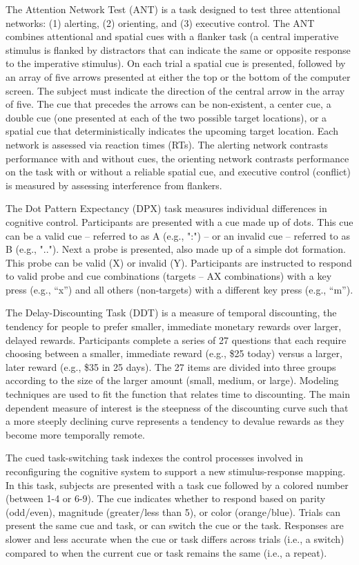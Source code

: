 \documentclass[sn-mathphys,Numbered, super]{sn-jnl}
\begin{document}
The Attention Network Test (ANT) is a task designed to test three attentional networks: (1) alerting, (2) orienting, and (3) executive control. The ANT combines attentional and spatial cues with a flanker task (a central imperative stimulus is flanked by distractors that can indicate the same or opposite response to the imperative stimulus). On each trial a spatial cue is presented, followed by an array of five arrows presented at either the top or the bottom of the computer screen. The subject must indicate the direction of the central arrow in the array of five. The cue that precedes the arrows can be non-existent, a center cue, a double cue (one presented at each of the two possible target locations), or a spatial cue that deterministically indicates the upcoming target location. Each network is assessed via reaction times (RTs). The alerting network contrasts performance with and without cues, the orienting network contrasts performance on the task with or without a reliable spatial cue, and executive control (conflict) is measured by assessing interference from flankers.

The Dot Pattern Expectancy (DPX) task measures individual differences in cognitive control. Participants are presented with a cue made up of dots. This cue can be a valid cue – referred to as A (e.g., ":") – or an invalid cue – referred to as B (e.g., ".."). Next a probe is presented, also made up of a simple dot formation. This probe can be valid (X) or invalid (Y). Participants are instructed to respond to valid probe and cue combinations (targets – AX combinations) with a key press (e.g., “x”) and all others (non-targets) with a different key press (e.g., “m”).

The Delay-Discounting Task (DDT) is a measure of temporal discounting, the tendency for people to prefer smaller, immediate monetary rewards over larger, delayed rewards. Participants complete a series of 27 questions that each require choosing between a smaller, immediate reward (e.g., \$25 today) versus a larger, later reward (e.g., \$35 in 25 days). The 27 items are divided into three groups according to the size of the larger amount (small, medium, or large). Modeling techniques are used to fit the function that relates time to discounting. The main dependent measure of interest is the steepness of the discounting curve such that a more steeply declining curve represents a tendency to devalue rewards as they become more temporally remote.

The cued task-switching task indexes the control processes involved in reconfiguring the cognitive system to support a new stimulus-response mapping. In this task, subjects are presented with a task cue followed by a colored number (between 1-4 or 6-9). The cue indicates whether to respond based on parity (odd/even), magnitude (greater/less than 5), or color (orange/blue). Trials can present the same cue and task, or can switch the cue or the task. Responses are slower and less accurate when the cue or task differs across trials (i.e., a switch) compared to when the current cue or task remains the same (i.e., a repeat).
\end{document}
